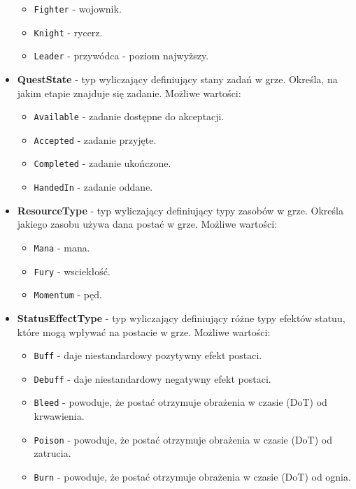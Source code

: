 \begin{itemize}
\begin{itemize}
                \item \texttt{Fighter} - wojownik.
                \item \texttt{Knight} - rycerz.
                \item \texttt{Leader} - przywódca - poziom najwyższy.
            \end{itemize}
        \item \textbf{QuestState} - typ wyliczający definiujący stany zadań w grze. 
        Określa, na jakim etapie znajduje się zadanie. Możliwe wartości:
            \begin{itemize}
                \item \texttt{Available} - zadanie dostępne do akceptacji.
                \item \texttt{Accepted} - zadanie przyjęte.
                \item \texttt{Completed} - zadanie ukończone.
                \item \texttt{HandedIn} - zadanie oddane.
            \end{itemize}
        \item \textbf{ResourceType} - typ wyliczający definiujący typy zasobów w grze. Określa jakiego zasobu używa dana postać w grze. Możliwe wartości:
            \begin{itemize}
                \item \texttt{Mana} - mana.
                \item \texttt{Fury} - wsciekłość.
                \item \texttt{Momentum} - pęd.
            \end{itemize}
        \item \textbf{StatusEffectType} - typ wyliczający definiujący różne typy efektów statuu, które mogą wpływać na postacie w grze. 
        Możliwe wartości:
            \begin{itemize}
                \item \texttt{Buff} - daje niestandardowy pozytywny efekt postaci.
                \item \texttt{Debuff} - daje niestandardowy negatywny efekt postaci.
                \item \texttt{Bleed} - powoduje, że postać otrzymuje obrażenia w czasie (DoT) od krwawienia.
                \item \texttt{Poison} - powoduje, że postać otrzymuje obrażenia w czasie (DoT) od zatrucia.
                \item \texttt{Burn} - powoduje, że postać otrzymuje obrażenia w czasie (DoT) od ognia.

\end{itemize}
\end{itemize}
